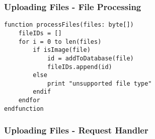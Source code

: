 \documentclass[../../main.tex]{subfiles}
\begin{document}

\subsubsection{Uploading Files - File Processing}

\begin{lstlisting}
function processFiles(files: byte[])
    fileIDs = []
    for i = 0 to len(files)
        if isImage(file)
            id = addToDatabase(file)
            fileIDs.append(id)
        else
            print "unsupported file type"
        endif
    endfor
endfunction
\end{lstlisting}

\subsubsection{Uploading Files - Request Handler}
\end{document}
